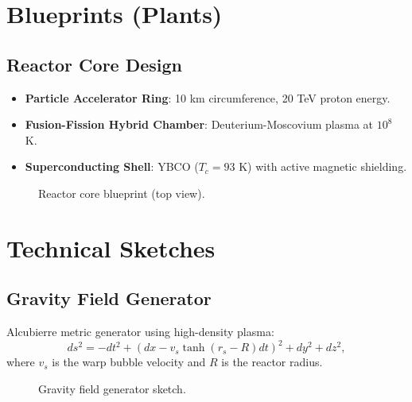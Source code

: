 \documentclass[12pt, a4paper]{article}
\begin{document}
\section*{Blueprints (Plants)}
\subsection*{Reactor Core Design}
\begin{itemize}
\item \textbf{Particle Accelerator Ring}: 10 km circumference, 20 TeV proton energy.
\item \textbf{Fusion-Fission Hybrid Chamber}: Deuterium-Moscovium plasma at \(10^8\) K.
\item \textbf{Superconducting Shell}: YBCO (\(T_c = 93\) K) with active magnetic shielding.
\end{itemize}

\begin{figure}[h]
\centering
{}
\caption{Reactor core blueprint (top view).}
\label{fig:blueprint}
\end{figure}

\section*{Technical Sketches}
\subsection*{Gravity Field Generator}
Alcubierre metric generator using high-density plasma:
\begin{equation}
ds^2 = -dt^2 + \left(dx - v_s \tanh(r_s - R) dt\right)^2 + dy^2 + dz^2, \label{eq:alcubierre}
\end{equation}
where \(v_s\) is the warp bubble velocity and \(R\) is the reactor radius.

\begin{figure}[h]
\centering
{}
\caption{Gravity field generator sketch.}
\label{fig:warp}
\end{figure}
\end{document}
